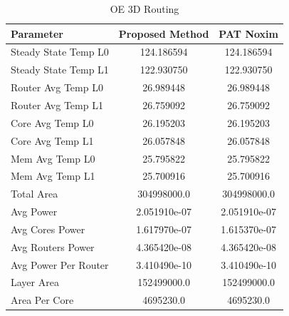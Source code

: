 \documentclass[conference]{IEEEtran}
\begin{document}
	\begin{table}[h!]
		\centering
		\begin{tabular}{|l|c|c|}
			\hline
			\textbf{Parameter} & \textbf{Proposed Method} & \textbf{PAT Noxim} \\ \hline
			Steady State Temp L0 & 124.186594 & 124.186594 \\ \hline
			Steady State Temp L1 & 122.930750 & 122.930750 \\ \hline
			Router Avg Temp L0 & 26.989448 & 26.989448 \\ \hline
			Router Avg Temp L1 & 26.759092 & 26.759092 \\ \hline
			Core Avg Temp L0 & 26.195203 & 26.195203 \\ \hline
			Core Avg Temp L1 & 26.057848 & 26.057848 \\ \hline
			Mem Avg Temp L0 & 25.795822 & 25.795822 \\ \hline
			Mem Avg Temp L1 & 25.700916 & 25.700916 \\ \hline
			Total Area & 304998000.0 & 304998000.0 \\ \hline
			Avg Power & 2.051910e-07 & 2.051910e-07 \\ \hline
			Avg Cores Power & 1.617970e-07 & 1.615370e-07 \\ \hline
			Avg Routers Power & 4.365420e-08 & 4.365420e-08 \\ \hline
			Avg Power Per Router & 3.410490e-10 & 3.410490e-10 \\ \hline
			Layer Area & 152499000.0 & 152499000.0 \\ \hline
			Area Per Core & 4695230.0 & 4695230.0 \\ \hline
		\end{tabular}
		\caption{OE 3D Routing}
		\label{table:oe_3d_routing}
	\end{table}
	
\end{document}
